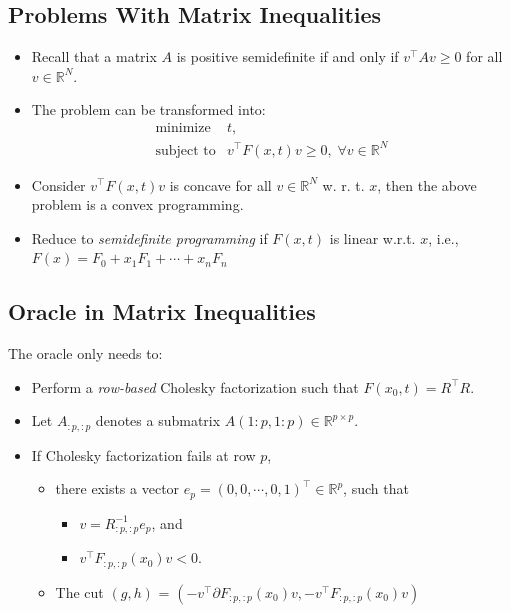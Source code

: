 \documentclass[]{article}
\providecommand{\tightlist}{%
  \setlength{\itemsep}{0pt}\setlength{\parskip}{0pt}}
\begin{document}
\hypertarget{problems-with-matrix-inequalities-1}{%
\subsection{Problems With Matrix
Inequalities}\label{problems-with-matrix-inequalities-1}}

\begin{itemize}
\tightlist
\item
  Recall that a matrix \(A\) is positive semidefinite if and only if
  \(v^\top A v \ge 0\) for all \(v \in \mathbb{R}^N\).
\item
  The problem can be transformed into: \[\begin{array}{ll}
            \text{minimize}      & t, \\
            \text{subject to}    & v^\top F(x, t) v \ge 0, \; \forall v \in \mathbb{R}^N
    \end{array}\]
\item
  Consider \(v^\top F(x, t) v\) is concave for all
  \(v \in \mathbb{R}^N\) w. r. t. \(x\), then the above problem is a
  convex programming.
\item
  Reduce to \emph{semidefinite programming} if \(F(x, t)\) is linear
  w.r.t. \(x\), i.e., \(F(x) = F_0 + x_1 F_1 + \cdots + x_n F_n\)
\end{itemize}

\hypertarget{oracle-in-matrix-inequalities}{%
\subsection{Oracle in Matrix
Inequalities}\label{oracle-in-matrix-inequalities}}

The oracle only needs to:

\begin{itemize}
\tightlist
\item
  Perform a \emph{row-based} Cholesky factorization such that
  \(F(x_0, t) = R^\top R\).
\item
  Let \(A_{:p,:p}\) denotes a submatrix
  \(A(1:p, 1:p) \in \mathbb{R}^{p\times p}\).
\item
  If Cholesky factorization fails at row \(p\),

  \begin{itemize}
  \tightlist
  \item
    there exists a vector
    \(e_p = (0, 0, \cdots, 0, 1)^\top \in \mathbb{R}^p\), such that

    \begin{itemize}
    \tightlist
    \item
      \(v = R_{:p,:p}^{-1} e_p\), and
    \item
      \(v^\top F_{:p,:p}(x_0) v < 0\).
    \end{itemize}
  \item
    The cut \((g, h)\) =
    \((-v^\top \partial F_{:p,:p}(x_0) v, -v^\top F_{:p,:p}(x_0) v)\)
  \end{itemize}
\end{itemize}
\end{document}
